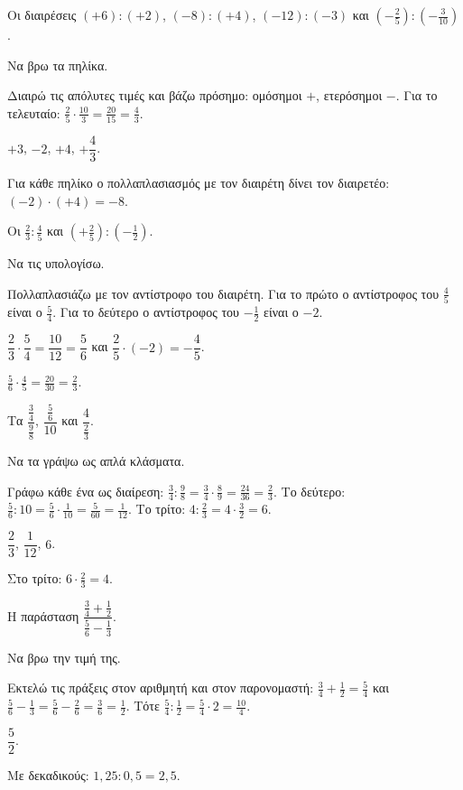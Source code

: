 \tixero Οι διαιρέσεις $(+6):(+2)$, $(-8):(+4)$, $(-12):(-3)$ και $\left(-\frac{2}{5}\right):\left(-\frac{3}{10}\right)$.\par
\tithelo Να βρω τα πηλίκα.\par
\possindeo Διαιρώ τις απόλυτες τιμές και βάζω πρόσημο: ομόσημοι $+$, ετερόσημοι $-$. Για το τελευταίο: $\frac{2}{5}\cdot\frac{10}{3}=\frac{20}{15}=\frac{4}{3}$.\par
\apantisi $+3$, $-2$, $+4$, $+\dfrac{4}{3}$.\par
\elegxos Για κάθε πηλίκο ο πολλαπλασιασμός με τον διαιρέτη δίνει τον διαιρετέο: $(-2)\cdot(+4)=-8$.

\tixero Οι $\frac{2}{3}:\frac{4}{5}$ και $\left(+\frac{2}{5}\right):\left(-\frac{1}{2}\right)$.\par
\tithelo Να τις υπολογίσω.\par
\possindeo Πολλαπλασιάζω με τον αντίστροφο του διαιρέτη. Για το πρώτο ο αντίστροφος του $\frac{4}{5}$ είναι ο $\frac{5}{4}$. Για το δεύτερο ο αντίστροφος του $-\frac{1}{2}$ είναι ο $-2$.\par
\apantisi $\dfrac{2}{3}\cdot\dfrac{5}{4}=\dfrac{10}{12}=\dfrac{5}{6}$ και $\dfrac{2}{5}\cdot(-2)=-\dfrac{4}{5}$.\par
\elegxos $\frac{5}{6}\cdot\frac{4}{5}=\frac{20}{30}=\frac{2}{3}$.

\tixero Τα $\dfrac{\frac{3}{4}}{\frac{9}{8}}$, $\dfrac{\frac{5}{6}}{10}$ και $\dfrac{4}{\frac{2}{3}}$.\par
\tithelo Να τα γράψω ως απλά κλάσματα.\par
\possindeo Γράφω κάθε ένα ως διαίρεση: $\frac{3}{4}:\frac{9}{8}=\frac{3}{4}\cdot\frac{8}{9}=\frac{24}{36}=\frac{2}{3}$. Το δεύτερο: $\frac{5}{6}:10=\frac{5}{6}\cdot\frac{1}{10}=\frac{5}{60}=\frac{1}{12}$. Το τρίτο: $4:\frac{2}{3}=4\cdot\frac{3}{2}=6$.\par
\apantisi $\dfrac{2}{3}$, $\dfrac{1}{12}$, $6$.\par
\elegxos Στο τρίτο: $6\cdot\frac{2}{3}=4$.

\tixero Η παράσταση $\dfrac{\frac{3}{4}+\frac{1}{2}}{\frac{5}{6}-\frac{1}{3}}$.\par
\tithelo Να βρω την τιμή της.\par
\possindeo Εκτελώ τις πράξεις στον αριθμητή και στον παρονομαστή: $\frac{3}{4}+\frac{1}{2}=\frac{5}{4}$ και $\frac{5}{6}-\frac{1}{3}=\frac{5}{6}-\frac{2}{6}=\frac{3}{6}=\frac{1}{2}$. Τότε $\frac{5}{4}:\frac{1}{2}=\frac{5}{4}\cdot2=\frac{10}{4}$.\par
\apantisi $\dfrac{5}{2}$.\par
\elegxos Με δεκαδικούς: $1{,}25:0{,}5=2{,}5$.

